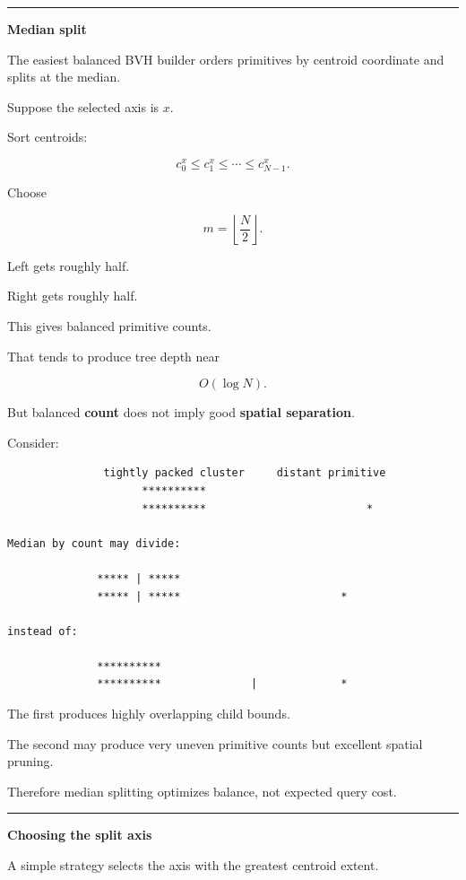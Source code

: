 \begin{center}\rule{0.5\linewidth}{0.5pt}\end{center}

\textbf{Median split}

The easiest balanced BVH builder orders primitives by centroid coordinate and splits at the median.

Suppose the selected axis is \(x\).

Sort centroids:

\[
c_0^x\le c_1^x\le\cdots\le c_{N-1}^x.
\]

Choose

\[
m=\left\lfloor\frac N2\right\rfloor.
\]

Left gets roughly half.

Right gets roughly half.

This gives balanced primitive counts.

That tends to produce tree depth near

\[
O(\log N).
\]

But balanced \textbf{count} does not imply good \textbf{spatial separation}.

Consider:

\begin{verbatim}
               tightly packed cluster     distant primitive
                     **********
                     **********                         *

Median by count may divide:

              ***** | *****
              ***** | *****                         *

instead of:

              **********
              **********              |             *
\end{verbatim}

The first produces highly overlapping child bounds.

The second may produce very uneven primitive counts but excellent spatial pruning.

Therefore median splitting optimizes balance, not expected query cost.

\begin{center}\rule{0.5\linewidth}{0.5pt}\end{center}

\textbf{Choosing the split axis}

A simple strategy selects the axis with the greatest centroid extent.

